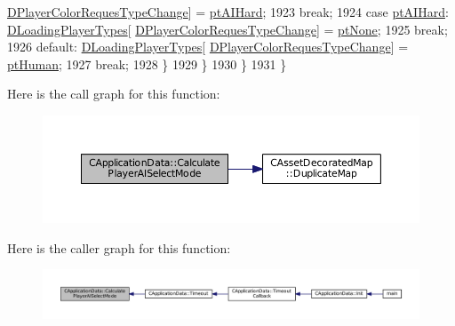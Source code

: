 \begin{DoxyCode}
      \hyperlink{classCApplicationData_a6724e09974db5fe5f147d9898f468dbc}{DPlayerColorRequesTypeChange}] = \hyperlink{classCApplicationData_ae04b6b340297311972ce1e955196fcaaa421a2ddbb6243ca4d7e886bcbf490af5}{ptAIHard};
1923                                     \textcolor{keywordflow}{break};
1924                 \textcolor{keywordflow}{case} \hyperlink{classCApplicationData_ae04b6b340297311972ce1e955196fcaaa421a2ddbb6243ca4d7e886bcbf490af5}{ptAIHard}:      \hyperlink{classCApplicationData_a2ac5711b027842d57aa5f8e5a7adc589}{DLoadingPlayerTypes}[
      \hyperlink{classCApplicationData_a6724e09974db5fe5f147d9898f468dbc}{DPlayerColorRequesTypeChange}] = \hyperlink{classCApplicationData_ae04b6b340297311972ce1e955196fcaaa091de1adaa447ed15f9f6bb25f0880f7}{ptNone};
1925                                     \textcolor{keywordflow}{break};
1926                 \textcolor{keywordflow}{default}:            \hyperlink{classCApplicationData_a2ac5711b027842d57aa5f8e5a7adc589}{DLoadingPlayerTypes}[
      \hyperlink{classCApplicationData_a6724e09974db5fe5f147d9898f468dbc}{DPlayerColorRequesTypeChange}] = \hyperlink{classCApplicationData_ae04b6b340297311972ce1e955196fcaaaf06f9bc64db8860bc03ecc330b11f234}{ptHuman};
1927                                     \textcolor{keywordflow}{break};
1928             \}
1929         \}
1930     \}
1931 \}
\end{DoxyCode}
Here is the call graph for this function\+:\nopagebreak
\begin{figure}[H]
\begin{center}
\leavevmode
\includegraphics[width=350pt]{classCApplicationData_afbd3d397ba6bb36452458cf8f62ef9dc_cgraph}
\end{center}
\end{figure}
Here is the caller graph for this function\+:\nopagebreak
\begin{figure}[H]
\begin{center}
\leavevmode
\includegraphics[width=350pt]{classCApplicationData_afbd3d397ba6bb36452458cf8f62ef9dc_icgraph}
\end{center}
\end{figure}
\hypertarget{classCApplicationData_aee18c113e9a0acb3cad3d63eb19de71b}{}\label{classCApplicationData_aee18c113e9a0acb3cad3d63eb19de71b} 
